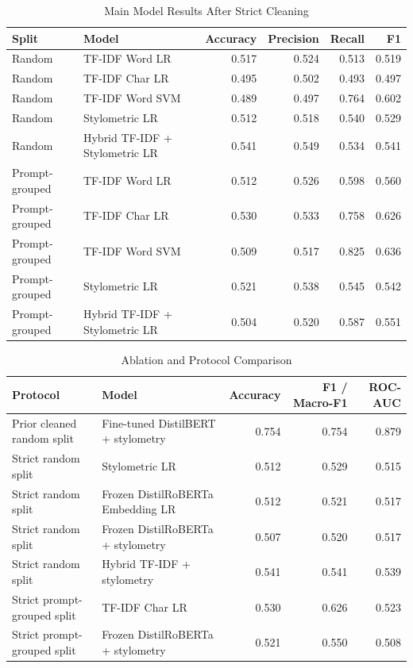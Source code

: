 \documentclass[conference]{IEEEtran}
\begin{document}
\begin{table}[htbp]
\caption{Main Model Results After Strict Cleaning}
\centering
\begin{tabular}{llrrrr}
\toprule
Split & Model & Accuracy & Precision & Recall & F1 \\
\midrule
Random & TF-IDF Word LR & 0.517 & 0.524 & 0.513 & 0.519 \\
Random & TF-IDF Char LR & 0.495 & 0.502 & 0.493 & 0.497 \\
Random & TF-IDF Word SVM & 0.489 & 0.497 & 0.764 & 0.602 \\
Random & Stylometric LR & 0.512 & 0.518 & 0.540 & 0.529 \\
Random & Hybrid TF-IDF + Stylometric LR & 0.541 & 0.549 & 0.534 & 0.541 \\
Prompt-grouped & TF-IDF Word LR & 0.512 & 0.526 & 0.598 & 0.560 \\
Prompt-grouped & TF-IDF Char LR & 0.530 & 0.533 & 0.758 & 0.626 \\
Prompt-grouped & TF-IDF Word SVM & 0.509 & 0.517 & 0.825 & 0.636 \\
Prompt-grouped & Stylometric LR & 0.521 & 0.538 & 0.545 & 0.542 \\
Prompt-grouped & Hybrid TF-IDF + Stylometric LR & 0.504 & 0.520 & 0.587 & 0.551 \\
\bottomrule
\end{tabular}
\label{tab:main-results}
\end{table}

\begin{table}[htbp]
\caption{Ablation and Protocol Comparison}
\centering
\begin{tabular}{llrrr}
\toprule
Protocol & Model & Accuracy & F1 / Macro-F1 & ROC-AUC \\
\midrule
Prior cleaned random split & Fine-tuned DistilBERT + stylometry & 0.754 & 0.754 & 0.879 \\
Strict random split & Stylometric LR & 0.512 & 0.529 & 0.515 \\
Strict random split & Frozen DistilRoBERTa Embedding LR & 0.512 & 0.521 & 0.517 \\
Strict random split & Frozen DistilRoBERTa + stylometry & 0.507 & 0.520 & 0.517 \\
Strict random split & Hybrid TF-IDF + stylometry & 0.541 & 0.541 & 0.539 \\
Strict prompt-grouped split & TF-IDF Char LR & 0.530 & 0.626 & 0.523 \\
Strict prompt-grouped split & Frozen DistilRoBERTa + stylometry & 0.521 & 0.550 & 0.508 \\
\bottomrule
\end{tabular}
\label{tab:ablation}
\end{table}
\end{document}
